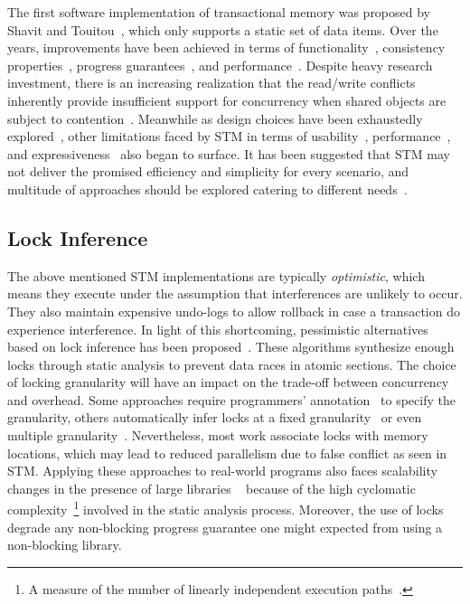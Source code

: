 \documentclass[10pt,conference,compsocconf]{IEEEtran}
\begin{document}
The first software implementation of transactional memory was proposed by Shavit and Touitou~\cite{shavit1997software}, which only supports a static set of data items.
Over the years, improvements have been achieved in terms of functionality~\cite{herlihy2003software}, consistency properties~\cite{guerraoui2008correctness}, progress guarantees~\cite{marathe2006lowering}, and performance~\cite{saha2006mcrt,dice2006transactional}. 
Despite heavy research investment, there is an increasing realization that the read/write conflicts inherently provide insufficient support for concurrency when shared objects are subject to contention~\cite{koskinen2010coarse}.
Meanwhile as design choices have been exhaustedly explored~\cite{marathe2004qualitative,marathe2004design}, other limitations faced by STM in terms of usability~\cite{Rossbach2010transactional}, performance~\cite{cascaval2008software}, and expressiveness~\cite{guerraoui2008obstruction} also began to surface.
It has been suggested that STM may not deliver the promised efficiency and simplicity for every scenario, and multitude of approaches should be explored catering to different needs~\cite{attiya2010inherent}.

\subsection{Lock Inference}
The above mentioned STM implementations are typically \emph{optimistic}, which means they execute under the assumption that interferences are unlikely to occur.
They also maintain expensive undo-logs to allow rollback in case a transaction do experience interference.
In light of this shortcoming, pessimistic alternatives based on lock inference has been proposed~\cite{mccloskey2006autolocker}.
These algorithms synthesize enough locks through static analysis to prevent data races in atomic sections.
The choice of locking granularity will have an impact on the trade-off between concurrency and overhead.
Some approaches require programmers' annotation~\cite{golan2013concurrent} to specify the granularity, others automatically infer locks at a fixed granularity~\cite{emmi2007lock} or even multiple granularity~\cite{cherem2008inferring}.
Nevertheless, most work associate locks with memory locations, which may lead to reduced parallelism due to false conflict as seen in STM. 
Applying these approaches to real-world programs also faces scalability changes in the presence of large libraries ~\cite{gudka2012lock} because of the high cyclomatic complexity~\footnote{A measure of the number of linearly independent execution paths~\cite{mccabe1976complexity}.} involved in the static analysis process.
Moreover, the use of locks degrade any non-blocking progress guarantee one might expected from using a non-blocking library.
\end{document}
